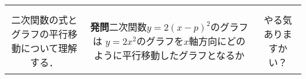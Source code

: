 \documentclass[paper=a4,fontsize=10.5pt]{jlreq}
\begin{document}
\begin{table}[h]
\begin{tabular}{|c|c|c|}
        \hline
        \begin{minipage}{\activee}
            \textbf{振り返り}\\
            二次関数の式とグラフの平行移動について理解する．
        \end{minipage}                     &
        \begin{minipage}{\valuee}
            \vspace{0.5em}
            \begin{framed}
                \textbf{発問}\hspace{1em}二次関数\(y=2(x-p)^2\)のグラフは
                \(y=2x^2\)のグラフを\(x\)軸方向にどのように平行移動したグラフとなるか
            \end{framed}
            \vspace{0.5em}
        \end{minipage}                                           &
        \begin{minipage}{\pointt}
            やる気ありますかい？
        \end{minipage}                                                                                     \\
        \hline
    \end{tabular}
\end{table}
\end{document}
